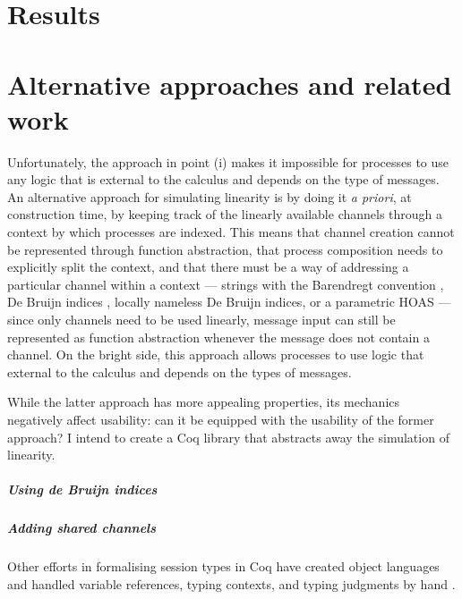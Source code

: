 \documentclass{mproj}
\begin{document}
\chapter{Results}\label{results}

\chapter{Alternative approaches and related work}\label{related-work}


Unfortunately, the approach in point (i) makes it impossible for processes to use any logic that is external to the calculus and depends on the type of messages. An alternative approach for simulating linearity is by doing it \emph{a priori}, at construction time, by keeping track of the linearly available channels through a context by which processes are indexed.  This means that channel creation cannot be represented through function abstraction, that process composition needs to explicitly split the context, and that there must be a way of addressing a particular channel within a context --- strings with the Barendregt convention \cite{Barendregt1984}, De Bruijn indices \cite{deBruijn1972}, locally nameless De Bruijn indices, or a parametric HOAS \cite{Chlipala2008} --- since only channels need to be used linearly, message input can still be represented as function abstraction whenever the message does not contain a channel. On the bright side, this approach allows processes to use logic that external to the calculus and depends on the types of messages.

While the latter approach has more appealing properties, its mechanics negatively affect usability: can it be equipped with the usability of the former approach? I intend to create a Coq library that abstracts away the simulation of linearity.

\paragraph{Using de Bruijn indices}

\paragraph{Adding shared channels}
Other efforts in formalising session types in Coq have created object languages and handled variable references, typing contexts, and typing judgments by hand \cite{Dilmore2019}.
\end{document}
